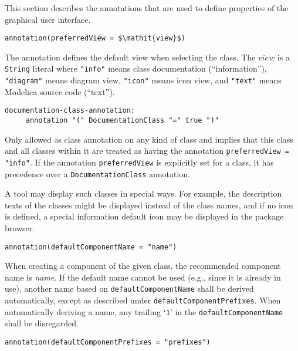 This section describes the annotations that are used to define properties of the graphical user interface.

\begin{lstlisting}[language=modelica]
annotation(preferredView = $\mathit{view}$)
\end{lstlisting}

The  annotation defines the default view when selecting the class.
The $\mathit{view}$ is a \lstinline!String! literal where \lstinline!"info"! means class documentation (``information''), \lstinline!"diagram"! means diagram view, \lstinline!"icon"! means icon view, and \lstinline!"text"! means Modelica source code (``text'').

\begin{lstlisting}[language=grammar]
  documentation-class-annotation:
     annotation "(" DocumentationClass "=" true ")"
\end{lstlisting}%

Only allowed as class annotation on any kind of class and implies that this class and all classes within it are treated as having the annotation \lstinline!preferredView = "info"!.
If the annotation \lstinline!preferredView! is explicitly set for a class, it has precedence over a \lstinline!DocumentationClass! annotation.

\begin{nonnormative}
A tool may display such classes in special ways.  For example, the description texts of the classes might be displayed instead
of the class names, and if no icon is defined, a special information default icon may be displayed in the package browser.
\end{nonnormative}

\begin{lstlisting}[language=modelica]
 annotation(defaultComponentName = "name")
\end{lstlisting}%

When creating a component of the given class, the recommended component name is \emph{name}.
If the default name cannot be used (e.g., since it is already in use), another name based on \lstinline!defaultComponentName! shall be derived automatically, except as described under \lstinline!defaultComponentPrefixes!.
When automatically deriving a name, any trailing `\lstinline!1!' in the \lstinline!defaultComponentName! shall be disregarded.

\begin{lstlisting}[language=modelica]
annotation(defaultComponentPrefixes = "prefixes")
\end{lstlisting}%

